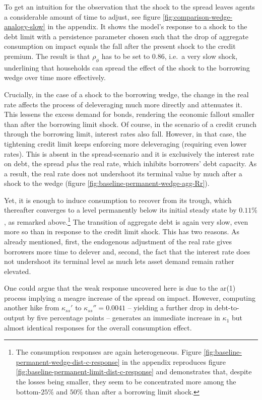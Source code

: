 \documentclass[a4paper,12pt]{article} %
\numberwithin{equation}{section} %
\numberwithin{figure}{section}
\numberwithin{table}{section}
\begin{document}
To get an intuition for the observation that the shock to the spread leaves agents a considerable amount of time to adjust, see figure \ref{fig:comparison-wedge-analogy-slow} in the appendix. It shows the model's response to a shock to the debt limit with a persistence parameter chosen such that the drop of aggregate consumption on impact equals the fall after the present shock to the credit premium. The result is that $\rho_{\phi}$ has to be set to $0.86$, i.e.~a very slow shock, underlining that households can spread the effect of the shock to the borrowing wedge over time more effectively.

Crucially, in the case of a shock to the borrowing wedge, the change in the real rate affects the process of deleveraging much more directly and attenuates it. This lessens the excess demand for bonds, rendering the economic fallout smaller than after the borrowing limit shock. Of course, in the scenario of a credit crunch through the borrowing limit, interest rates also fall. However, in that case, the tightening credit limit keeps enforcing more deleveraging (requiring even lower rates). This is absent in the spread-scenario and it is exclusively the interest rate on debt, the spread \textit{plus} the real rate, which inhibits borrowers' debt capacity. As a result, the real rate does not undershoot its terminal value by much after a shock to the wedge (figure \ref{fig:baseline-permanent-wedge-agg-Rr}). 

Yet, it is enough to induce consumption to recover from its trough, which thereafter converges to a level permanently below its initial steady state by $0.11\%$, as remarked above.\footnote{The consumption responses are again heterogeneous. Figure \ref{fig:baseline-permanent-wedge-dist-c-response} in the appendix reproduces figure \ref{fig:baseline-permanent-limit-dist-c-response} and demonstrates that, despite the losses being smaller, they seem to be concentrated more among the bottom-$25\%$ and $50\%$ than after a borrowing limit shock.} The transition of aggregate debt is again very slow, even more so than in response to the credit limit shock. This has two reasons. As already mentioned, first, the endogenous adjustment of the real rate gives borrowers more time to delever and, second, the fact that the interest rate does not undershoot its terminal level as much lets asset demand remain rather elevated.

One could argue that the weak response uncovered here is due to the \Gls{ar}(1) process implying a meagre increase of the spread on impact. However, computing another hike from $\kappa_{ss}'$ to $\kappa_{ss}'' = 0.0041$ -- yielding a further drop in debt-to-output by five percentage points -- generates an immediate increase in $\kappa_1$ but almost identical responses for the overall consumption effect.
\end{document}
